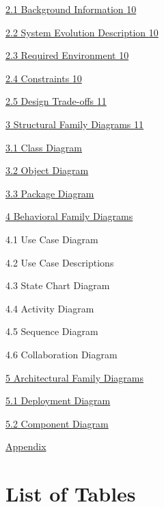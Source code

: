 \hyperref[background-information]{2.1 Background Information
\hyperref[background-information]{10}}

\hyperref[system-evolution-description]{2.2 System Evolution Description
\hyperref[system-evolution-description]{10}}

\hyperref[required-environment-1]{2.3 Required Environment
\hyperref[required-environment-1]{10}}

\hyperref[constraints]{2.4 Constraints \hyperref[constraints]{10}}

\hyperref[design-trade-offs]{2.5 Design Trade-offs
\hyperref[design-trade-offs]{11}}

\hyperref[structural-family-diagrams]{3 Structural Family Diagrams
\hyperref[structural-family-diagrams]{11}}

\hyperref[_Toc287863409]{3.1 Class Diagram}

\hyperref[_Toc287863410]{3.2 Object Diagram}

\hyperref[_Toc287863411]{3.3 Package Diagram}

\hyperref[behavioral-family-diagrams]{4 Behavioral Family Diagrams}

4.1 Use Case Diagram

4.2 Use Case Descriptions

4.3 State Chart Diagram

4.4 Activity Diagram

4.5 Sequence Diagram

4.6 Collaboration Diagram

\hyperref[_Toc287863413]{5 Architectural Family Diagrams}

\hyperref[_Toc287863414]{5.1 Deployment Diagram}

\hyperref[_Toc287863415]{5.2 Component Diagram}

\hyperref[_Toc287863431]{Appendix}

\section{List of Tables}\label{list-of-tables}

